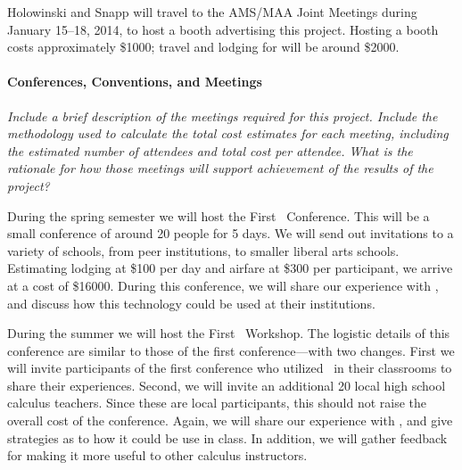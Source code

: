 \vspace{\topsep}

Holowinski and Snapp will travel to the AMS/MAA Joint Meetings during
January 15--18, 2014, to host a booth advertising this project.
Hosting a booth costs approximately \$1000; travel and lodging for
will be around \$2000.


\paragraph{Conferences, Conventions, and Meetings}
\textsl{Include a brief description of the meetings required for this
  project. Include the methodology used to calculate the total cost
  estimates for each meeting, including the estimated number of
  attendees and total cost per attendee. What is the rationale for how
  those meetings will support achievement of the results of the
  project?}

\vspace{\topsep}

During the spring semester we will host the First
\mooculus\ Conference. This will be a small conference of around 20
people for 5 days. We will send out invitations to a variety of
schools, from peer institutions, to smaller liberal arts
schools. Estimating lodging at \$100 per day and airfare at \$300 per
participant, we arrive at a cost of \$16000. During this conference,
we will share our experience with \mooculus, and discuss how this
technology could be used at their institutions.

During the summer we will host the First \mooculus\ Workshop. The
logistic details of this conference are similar to those of the first
conference---with two changes. First we will invite participants of
the first conference who utilized \mooculus\ in their classrooms to
share their experiences. Second, we will invite an additional 20 local
high school calculus teachers. Since these are local participants,
this should not raise the overall cost of the conference. Again, we
will share our experience with \mooculus, and give strategies as to
how it could be use in class. In addition, we will gather feedback for
making it more useful to other calculus instructors.
